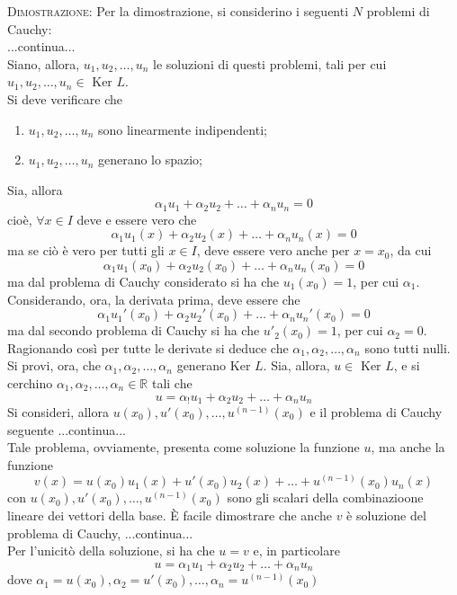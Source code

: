 \documentclass[a4paper]{extarticle}
\begin{document}
\vspace{2em}
\noindent
\normalfont \normalsize
\textsc{Dimostrazione}: Per la dimostrazione, si considerino i seguenti $N$ problemi di Cauchy:\\
...continua...\\
Siano, allora, $u_1,u_2,\dots,u_n$ le soluzioni di questi problemi, tali per cui $u_1,u_2,\dots,u_n \in \text{ Ker } L$.\\
Si deve verificare che
\begin{enumerate}
    \item $u_1,u_2,\dots,u_n$ sono linearmente indipendenti;
    \item $u_1,u_2,\dots,u_n$ generano lo spazio;
\end{enumerate}
Sia, allora
\[\alpha_1 u_1 + \alpha_2 u_2 + \dots + \alpha_n u_n = 0\]
cioè, $\forall x \in I$ deve e essere vero che
\[\alpha_1 u_1(x) + \alpha_2 u_2(x) + \dots + \alpha_n u_n(x) = 0\]
ma se ciò è vero per tutti gli $x \in I$, deve essere vero anche per $x=x_0$, da cui
\[\alpha_1 u_1(x_0) + \alpha_2 u_2(x_0) + \dots + \alpha_n u_n(x_0) = 0\]
ma dal problema di Cauchy considerato si ha che $u_1(x_0) = 1$, per cui $\alpha_1$.\\
Considerando, ora, la derivata prima, deve essere che
\[\alpha_1 u_1'(x_0) + \alpha_2 u_2'(x_0) + \dots + \alpha_n u_n'(x_0) = 0\]
ma dal secondo problema di Cauchy si ha che $u'_2(x_0)=1$, per cui $\alpha_2=0$. Ragionando così per tutte le derivate si deduce che $\alpha_1,\alpha_2,\dots,\alpha_n$ sono tutti nulli.\\
Si provi, ora, che $\alpha_1,\alpha_2,\dots,\alpha_n$ generano Ker $L$. Sia, allora, $u \in \text{ Ker } L$, e si cerchino $\alpha_1,\alpha_2,\dots,\alpha_n \in \mathbb{R}$ tali che
\[u=\alpha_! u_1 + \alpha_2 u_2 + \dots + \alpha_n u_n\]
Si consideri, allora $u(x_0),u'(x_0),\dots,u^{(n-1)}(x_0)$ e il problema di Cauchy seguente
...continua...\\
Tale problema, ovviamente, presenta come soluzione la funzione $u$, ma anche la funzione
\[v(x)=u(x_0)u_1(x) + u'(x_0)u_2(x) + \dots + u^{(n-1)}(x_0) u_{n}(x)\]
con $u(x_0),u'(x_0),\dots,u^{(n-1)}(x_0)$ sono gli scalari della combinazioone lineare dei vettori della base. È facile dimostrare che anche $v$ è soluzione del problema di Cauchy, ...continua...\\
Per l'unicitò della soluzione, si ha che $u=v$ e, in particolare
\[u=\alpha_1 u_1 + \alpha_2 u_2 + \dots + \alpha_n u_n\]
dove $\alpha_1=u(x_0), \alpha_2=u'(x_0), \dots, \alpha_n=u^{(n-1)}(x_0)$
\end{document}
